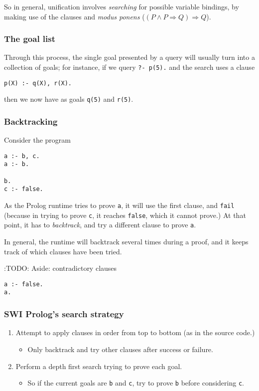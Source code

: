 \documentclass[11pt]{article}
\begin{document}
So in general, unification involves \emph{searching} for possible
variable bindings, by making use of the clauses
and \emph{modus ponens} (\((P ∧ P ⇒ Q) ⇒ Q\)).

\subsubsection{The goal list}
\label{sec:org7ab4224}
Through this process, the single goal presented by a query
will usually turn into a collection of goals;
for instance, if we query \texttt{?- p(5).} and the search uses a clause
\begin{verbatim}
p(X) :- q(X), r(X).
\end{verbatim}
then we now have as goals \texttt{q(5)} and \texttt{r(5)}.

\subsubsection{Backtracking}
\label{sec:org7203683}
Consider the program
\begin{verbatim}
a :- b, c.
a :- b.

b.
c :- false.
\end{verbatim}

As the Prolog runtime tries to prove \texttt{a}, it will use the first clause,
and \texttt{fail} (because in trying to prove \texttt{c}, it reaches \texttt{false},
which it cannot prove.)
At that point, it has to \emph{backtrack}, and try a different
clause to prove \texttt{a}.

In general, the runtime will backtrack several times
during a proof, and it keeps track of which clauses
have been tried.

:TODO: Aside: contradictory clauses
\begin{verbatim}
a :- false.
a.
\end{verbatim}

\subsubsection{SWI Prolog's search strategy}
\label{sec:org3926926}
\begin{enumerate}
\item Attempt to apply clauses in order from top to bottom
(as in the source code.)
\begin{itemize}
\item Only backtrack and try other clauses
after success or failure.
\end{itemize}
\item Perform a depth first search trying to prove each goal.
\begin{itemize}
\item So if the current goals are \texttt{b} and \texttt{c},
try to prove \texttt{b} before considering \texttt{c}.
\end{itemize}
\end{enumerate}
\end{document}
